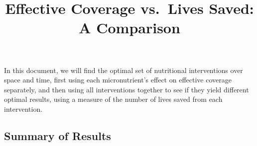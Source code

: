 \documentclass[
]{article}
\title{Effective Coverage vs.~Lives Saved: A Comparison}
\author{}
\date{}
\begin{document}
\maketitle

In this document, we will find the optimal set of nutritional
interventions over space and time, first using each micronutrient's
effect on effective coverage separately, and then using all
interventions together to see if they yield different optimal results,
using a measure of the number of lives saved from each intervention.

\hypertarget{summary-of-results}{%
\subsection{Summary of Results}\label{summary-of-results}}
\end{document}
